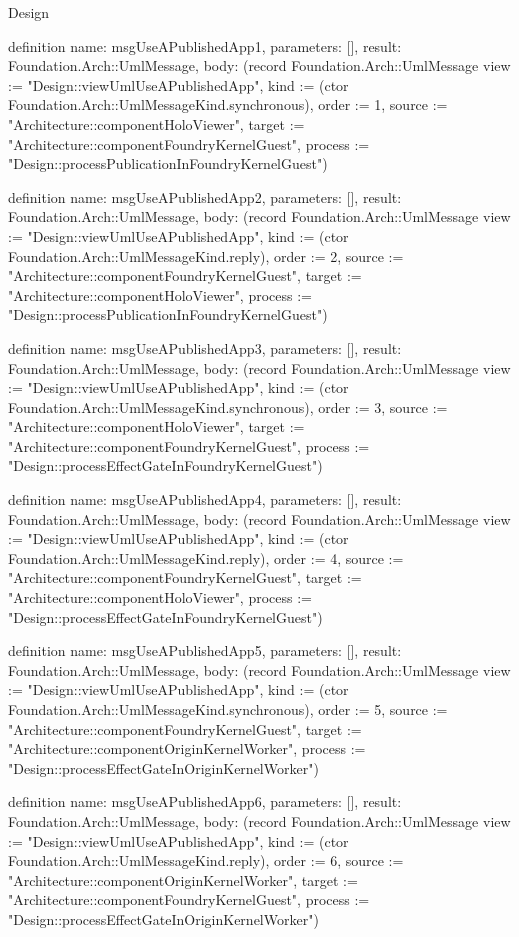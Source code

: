 \begin{lexlean}{Design}
\begin{semanticmodule}
definition{
  name: msgUseAPublishedApp1,
  parameters: [],
  result: Foundation.Arch::UmlMessage,
  body: (record Foundation.Arch::UmlMessage {view := "Design::viewUmlUseAPublishedApp", kind := (ctor Foundation.Arch::UmlMessageKind.synchronous), order := 1, source := "Architecture::componentHoloViewer", target := "Architecture::componentFoundryKernelGuest", process := "Design::processPublicationInFoundryKernelGuest"})
}

definition{
  name: msgUseAPublishedApp2,
  parameters: [],
  result: Foundation.Arch::UmlMessage,
  body: (record Foundation.Arch::UmlMessage {view := "Design::viewUmlUseAPublishedApp", kind := (ctor Foundation.Arch::UmlMessageKind.reply), order := 2, source := "Architecture::componentFoundryKernelGuest", target := "Architecture::componentHoloViewer", process := "Design::processPublicationInFoundryKernelGuest"})
}

definition{
  name: msgUseAPublishedApp3,
  parameters: [],
  result: Foundation.Arch::UmlMessage,
  body: (record Foundation.Arch::UmlMessage {view := "Design::viewUmlUseAPublishedApp", kind := (ctor Foundation.Arch::UmlMessageKind.synchronous), order := 3, source := "Architecture::componentHoloViewer", target := "Architecture::componentFoundryKernelGuest", process := "Design::processEffectGateInFoundryKernelGuest"})
}

definition{
  name: msgUseAPublishedApp4,
  parameters: [],
  result: Foundation.Arch::UmlMessage,
  body: (record Foundation.Arch::UmlMessage {view := "Design::viewUmlUseAPublishedApp", kind := (ctor Foundation.Arch::UmlMessageKind.reply), order := 4, source := "Architecture::componentFoundryKernelGuest", target := "Architecture::componentHoloViewer", process := "Design::processEffectGateInFoundryKernelGuest"})
}

definition{
  name: msgUseAPublishedApp5,
  parameters: [],
  result: Foundation.Arch::UmlMessage,
  body: (record Foundation.Arch::UmlMessage {view := "Design::viewUmlUseAPublishedApp", kind := (ctor Foundation.Arch::UmlMessageKind.synchronous), order := 5, source := "Architecture::componentFoundryKernelGuest", target := "Architecture::componentOriginKernelWorker", process := "Design::processEffectGateInOriginKernelWorker"})
}

definition{
  name: msgUseAPublishedApp6,
  parameters: [],
  result: Foundation.Arch::UmlMessage,
  body: (record Foundation.Arch::UmlMessage {view := "Design::viewUmlUseAPublishedApp", kind := (ctor Foundation.Arch::UmlMessageKind.reply), order := 6, source := "Architecture::componentOriginKernelWorker", target := "Architecture::componentFoundryKernelGuest", process := "Design::processEffectGateInOriginKernelWorker"})
}


\end{semanticmodule}
\end{lexlean}
